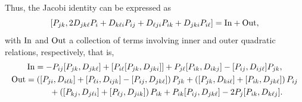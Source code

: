 \documentclass[10pt,a4paper]{amsart}
\numberwithin{equation}{section}
\begin{document}
Thus, the Jacobi identity can be expressed as
\[ [P_{jk}, 2D_{jk\ell}P_i + D_{k\ell i}P_{ij}+ D_{ \ell ji}P_{ik}+D_{jki}P_{i\ell}] = {\rm In} +{\rm Out}, \]
with $\rm In$ and ${\rm Out}$ a collection of terms involving inner and outer quadratic relations, respectively, that is,
 \begin{gather*}
{\rm In}= - P_{ij}[P_{jk}, D_{jk\ell}]+ [P_{i \ell}[P_{jk}, D_{jki}]]+P_{j\ell} [P_{ik}, D_{ikj}]-[P_{ij}, D_{ij\ell}] P_{jk}, \\
   {\rm Out}= \left( [P_{ji}, D_{i\ell k}]+[ P_{\ell i}, D_{i jk}] -[P_{ij}, D_{jk\ell}]\right) P_{jk}
    +\left([P_{jk}, D_{ki\ell}] +[P_{ik}, D_{jk\ell}]\right)P_{ij}\\
   \phantom{ Out= }{}  + \left( [P_{kj}, D_{j\ell i}]+[P_{\ell j}, D_{jik}]\right)P_{ik}+ P_{ik}[ P_{ij}, D_{jk\ell}] -2P_j [ P_{ik}, D_{k\ell j}].
    \end{gather*}
\end{document}
